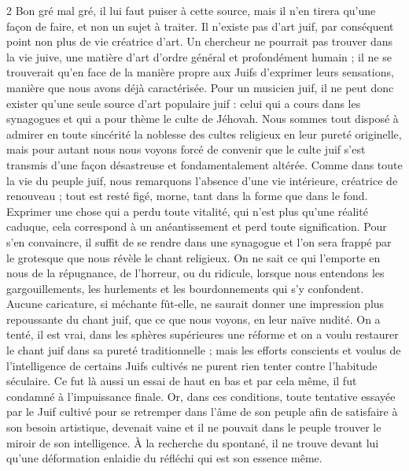 \documentclass[a4paper,12pt]{article}
\begin{document}
\begin{paracol}{2}
         {Bon gré mal gré, il lui faut puiser à cette source, mais il n’en tirera qu’une façon de faire, et non un sujet à traiter. Il n’existe pas d’art juif, par conséquent point non plus de vie créatrice d’art. Un chercheur ne pourrait pas trouver dans la vie juive, une matière d’art d’ordre général et profondément humain ; il ne se trouverait qu’en face de la manière propre aux Juifs d’exprimer leurs sensations, manière que nous avons déjà caractérisée. Pour un musicien juif, il ne peut donc exister qu’une seule source d’art populaire juif : celui qui a cours dans les synagogues et qui a pour thème le culte de Jéhovah. Nous sommes tout disposé à admirer en toute sincérité la noblesse des cultes religieux en leur pureté originelle, mais pour autant nous nous voyons forcé de convenir que le culte juif s’est transmis d’une façon désastreuse et fondamentalement altérée. Comme dans toute la vie du peuple juif, nous remarquons l’absence d’une vie intérieure, créatrice de renouveau ; tout est resté figé, morne, tant dans la forme que dans le fond. Exprimer une chose qui a perdu toute vitalité, qui n’est plus qu’une réalité caduque, cela correspond à un anéantissement et perd toute signification. Pour s’en convaincre, il suffit de se rendre dans une synagogue et l’on sera frappé par le grotesque que nous révèle le chant religieux. On ne sait ce qui l’emporte en nous de la répugnance, de l’horreur, ou du ridicule, lorsque nous entendons les gargouillements, les hurlements et les bourdonnements qui s’y confondent. Aucune caricature, si méchante fût-elle, ne saurait donner une impression plus repoussante du chant juif, que ce que nous voyons, en leur naïve nudité. On a tenté, il est vrai, dans les sphères supérieures une réforme et on a voulu restaurer le chant juif dans sa pureté traditionnelle ; mais les efforts conscients et voulus de l’intelligence de certains Juifs cultivés ne purent rien tenter contre l’habitude séculaire. Ce fut là aussi un essai de haut en bas et par cela même, il fut condamné à l’impuissance finale. Or, dans ces conditions, toute tentative essayée par le Juif cultivé pour se retremper dans l’âme de son peuple afin de satisfaire à son besoin artistique, devenait vaine et il ne pouvait dans le peuple trouver le miroir de son intelligence. À la recherche du spontané, il ne trouve devant lui qu’une déformation enlaidie du réfléchi qui est son essence même.}

\end{paracol}
\end{document}
